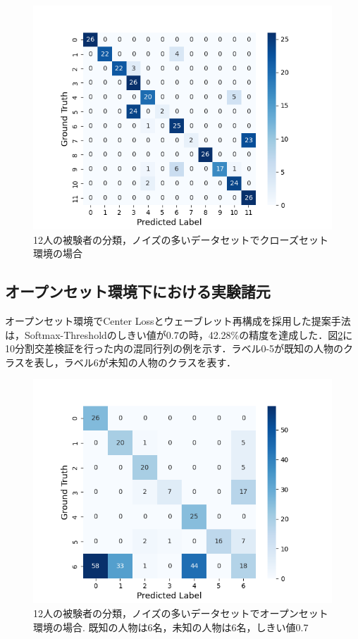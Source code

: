 \begin{figure}[H]
\begin{center}
\includegraphics[width=\linewidth]{./fig/noisy_dataset/cross_val_Fold0_close.png}
\end{center}
\caption{12人の被験者の分類，ノイズの多いデータセットでクローズセット環境の場合}
\label{fig:12close-conf}
\end{figure}

\subsection{オープンセット環境下における実験諸元}
オープンセット環境でCenter Lossとウェーブレット再構成を採用した提案手法は，Softmax-Thresholdのしきい値が0.7の時，42.28\%の精度を達成した．図\ref{fig:12open-conf}に10分割交差検証を行った内の混同行列の例を示す．ラベル0-5が既知の人物のクラスを表し，ラベル6が未知の人物のクラスを表す．

\begin{figure}[H]
  \begin{center}
  \includegraphics[width=\linewidth]{./fig/noisy_dataset/cross_val_Fold0_threshold0.7_6_6.png}
  \end{center}
\caption{12人の被験者の分類，ノイズの多いデータセットでオープンセット環境の場合.
既知の人物は6名，未知の人物は6名，しきい値0.7}
\label{fig:12open-conf}
\end{figure}



